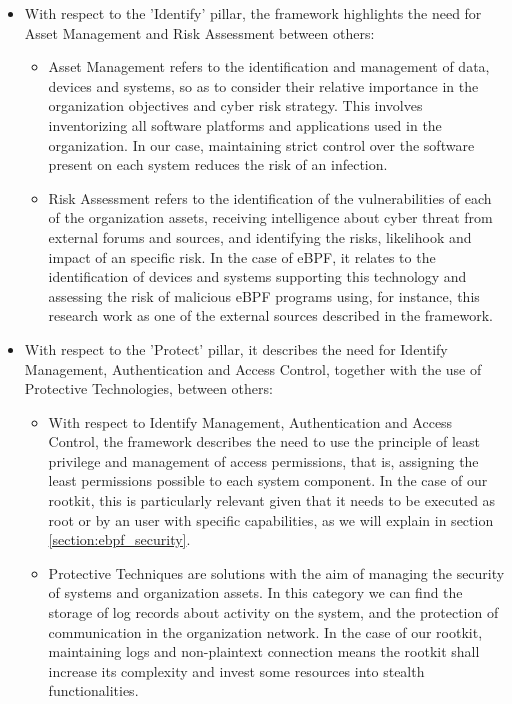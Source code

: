 \begin{itemize}
\item With respect to the 'Identify' pillar, the framework highlights the need for Asset Management and Risk Assessment between others:
	\begin{itemize}
	\item Asset Management refers to the identification and management of data, devices and systems, so as to consider their relative importance in the organization objectives and cyber risk strategy. This involves inventorizing all software platforms and applications used in the organization. In our case, maintaining strict control over the software present on each system reduces the risk of an infection.
	\item Risk Assessment refers to the identification of the vulnerabilities of each of the organization assets, receiving intelligence about cyber threat from external forums and sources, and identifying the risks, likelihook and impact of an specific risk. In the case of eBPF, it relates to the identification of devices and systems supporting this technology and assessing the risk of malicious eBPF programs using, for instance, this research work as one of the external sources described in the framework.
	\end{itemize}
\item With respect to the 'Protect' pillar, it describes the need for Identify Management, Authentication and Access Control, together with the use of Protective Technologies, between others:
	\begin{itemize}
	\item With respect to Identify Management, Authentication and Access Control, the framework describes the need to use the principle of least privilege and management of access permissions, that is, assigning the least permissions possible to each system component. In the case of our rootkit, this is particularly relevant given that it needs to be executed as root or by an user with specific capabilities, as we will explain in section \ref{section:ebpf_security}.
	\item Protective Techniques are solutions with the aim of managing the security of systems and organization assets. In this category we can find the storage of log records about activity on the system, and the protection of communication in the organization network. In the case of our rootkit, maintaining logs and non-plaintext connection means the rootkit shall increase its complexity and invest some resources into stealth functionalities.

\end{itemize}
\end{itemize}

